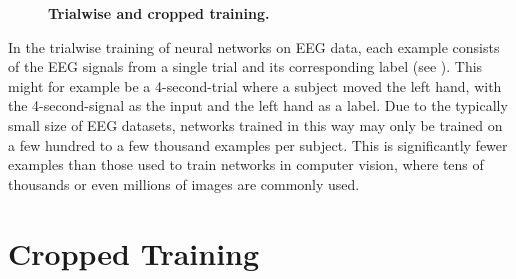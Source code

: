 \begin{figure}[bth]
    \myfloatalign
     \quad
    \caption[Trialwise and cropped training]{\textbf{Trialwise and cropped training.}}\label{cropped-and-trialwise-figure}
\end{figure}


In the trialwise training of neural networks on EEG data, each example
consists of the EEG signals from a single trial and its corresponding
label (see ). This might for example be a 4-second-trial where a subject moved
the left hand, with the 4-second-signal as the input and the left hand
as a label. Due to the typically small size of EEG datasets, networks
trained in this way may only be trained on a few hundred to a few
thousand examples per subject. This is significantly fewer examples than
those used to train networks in computer vision, where tens of thousands
or even millions of images are commonly used.


\section{Cropped Training}\label{cropped-training-section}

